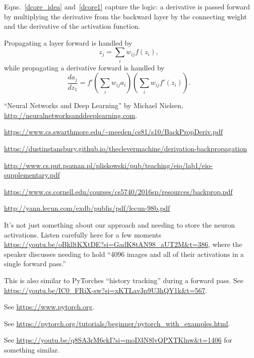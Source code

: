 \documentclass[12pt]{article}
\begin{document}
Eqns.~\ref{dcore_idea} and~\ref{dcore1} capture the logic: a derivative is passed forward by multiplying the derivative from the backward layer by the connecting weight and the derivative of the activation function.

Propagating a layer forward is handled by
\begin{equation}
z_j=\sum_i w_{ij} f(z_i),
\end{equation}
while propagating a derivative forward is handled by
\begin{equation}
\frac{da_j}{dz_1}=f'\left(\sum_i w_{ij}a_i\right)\left(\sum_i w_{ij}f'(z_i)\right).
\end{equation}















\begin{thebibliography}{99}

 ``Neural Networks and Deep Learning'' by Michael Nielsen, \url{http://neuralnetworksanddeeplearning.com}.

 \url{https://www.cs.swarthmore.edu/~meeden/cs81/s10/BackPropDeriv.pdf}

 \url{https://dustinstansbury.github.io/theclevermachine/derivation-backpropagation}

 \url{http://www.cs.put.poznan.pl/pliskowski/pub/teaching/eio/lab1/eio-supplementary.pdf}

 \url{https://www.cs.cornell.edu/courses/cs5740/2016sp/resources/backprop.pdf}

 \url{http://yann.lecun.com/exdb/publis/pdf/lecun-98b.pdf}

 It's not just something about our approach and needing to store the neuron activations.  Listen carefully here for a few moments \url{https://youtu.be/oBklltKXtDE?si=GadK8tAN98_aUT2M&t=386}, where the speaker discusses needing to hold ``4096 images and all of their activations in a single forward pass.''

 This is also similar to PyTorches ``history tracking'' during a forward pass.  See \url{https://youtu.be/IC0_FRiX-sw?si=xKTLav3p9U3hQY1k&t=567}.

 See \url{https://www.pytorch.org}.

 See \url{https://pytorch.org/tutorials/beginner/pytorch_with_examples.html}.

 See \url{https://youtu.be/q8SA3rM6ckI?si=moD3N8lvQPXTKlnw&t=1406} for something similar.

\end{thebibliography}
\end{document}
